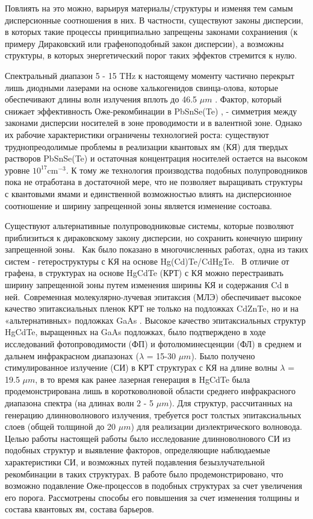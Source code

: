 \documentclass[../main.tex]{subfiles}
\begin{document}
Повлиять на это можно, варьируя материалы/структуры и изменяя тем самым дисперсионные соотношения в них. В частности,
существуют законы дисперсии, в которых такие процессы принципиально запрещены законами сохраниения (к примеру Дираковский 
или графеноподобный закон дисперсии), а возможны структуры, в которых энергетический порог таких эффектов стремится к нулю.

Спектральный диапазон 5 - 15 THz к настоящему моменту частично 
перекрыт лишь диодными лазерами на основе халькогенидов свинца-олова, которые обеспечивают длины 
волн излучения вплоть до 46.5 $\mu m$ \cite{Intro8}. Фактор, который снижает эффективность Оже-рекомбинации в PbSnSe(Te) \cite{Intro1}, \cite{Intro9}
- симметрия между законами дисперсии носителей в зоне проводимости и в валентной зоне. Однако их рабочие характеристики 
ограничены технологией роста: существуют труднопреодолимые проблемы в реализации квантовых ям (КЯ) для твердых растворов 
PbSnSe(Te) и остаточная концентрация носителей остается на высоком уровне $10^{17} \text{cm}^{-3}$. К тому же технология производства подобных
полупроводников пока не отработана в достаточной мере, что не позволяет выращивать структуры с квантовыми ямами и единственной возможностью
влиять на дисперсионное соотношение и ширину запрещенной зоны является изменение состоава.

Существуют альтернативные полупроводниковые системы, которые позволяют
приблизиться к дираковскому закону дисперсии, но сохранить конечную ширину запрещенной зоны. 
Как было показано в многочисленных работах, одна из таких систем - гетероструктуры с КЯ на основе Hg(Cd)Te/CdHgTe. 
В отличие от графена, в структурах на основе HgCdTe (КРТ) с КЯ можно перестраивать ширину запрещенной зоны путем изменения ширины КЯ и 
содержания Cd в ней. Современная молекулярно-лучевая эпитаксия (МЛЭ) обеспечивает высокое качество эпитаксиальных пленок КРТ не только на подложках CdZnTe, 
но и на «альтернативных» подложках GaAs \cite{Varavin:2003}. Высокое качество эпитаксиальных структур HgCdTe, выращенных на GaAs подложках, было подтверждено в ходе исследований 
фотопроводимости (ФП) и фотолюминесценции (ФЛ) в среднем и дальнем инфракрасном диапазонах ($λ$ = 15-30 $\mu m$). Было получено 
стимулированное излучение (СИ) в КРТ структурах с КЯ на длине волны $λ$ = 19.5 $\mu m$, в то время как ранее лазерная генерация в HgCdTe была 
продемонстрирована лишь в коротковолновой области среднего инфракрасного диапазона спектра (на длинах волн 2 - 5 $\mu m$). 
Для структур, рассчитанных на генерацию длинноволнового излучения, требуется рост толстых эпитаксиальных слоев (общей толщиной до 20 $\mu m$) для реализации диэлектрического волновода. 
Целью работы настоящей работы было исследование длинноволнового СИ из подобных структур и выявление факторов, определяющие наблюдаемые характеристики СИ, и возможных путей подавления 
безызлучательной рекомбинации в таких структурах. В работе было продемонстрировано, что возможно подавление Оже-процессов в подобных структурах за счет увеличения его порога. Рассмотрены 
способы его повышения за счет изменения толщины и состава квантовых ям, состава барьеров.
\end{document}

